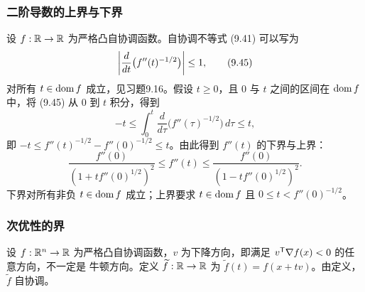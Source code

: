 \subsubsection*{二阶导数的上界与下界}
设 $f:\mathbb R\to\mathbb R$ 为严格凸自协调函数。自协调不等式 (9.41) 可以写为
\begin{equation}
 \left\lvert \frac d{dt}\bigl(f''(t)^{-1/2}\bigr)\right\rvert\le1,\tag{9.45}
\end{equation}
对所有 $t\in\operatorname{dom} f$ 成立，见习题9.16。假设 $t\ge0$，且 $0$ 与 $t$ 之间的区间在 $\operatorname{dom} f$ 中，将 (9.45) 从 $0$ 到 $t$ 积分，得到
\[
 -t\le\int_0^t\frac d{d\tau}\bigl(f''(\tau)^{-1/2}\bigr)\,d\tau\le t,
\]
即 $-t\le f''(t)^{-1/2}-f''(0)^{-1/2}\le t$。由此得到 $f''(t)$ 的下界与上界：
\begin{equation}
 \frac{f''(0)}{(1+tf''(0)^{1/2})^2}\le f''(t)
 \le\frac{f''(0)}{(1-tf''(0)^{1/2})^2}.\tag{9.46}
\end{equation}
下界对所有非负 $t\in\operatorname{dom} f$ 成立；上界要求 $t\in\operatorname{dom} f$ 且 $0\le t<f''(0)^{-1/2}$。

\subsubsection*{次优性的界}
设 $f:\mathbb R^n\to\mathbb R$ 为严格凸自协调函数，$v$ 为下降方向，即满足 $v^\mathsf T\nabla f(x)<0$ 的任意方向，不一定是
牛顿方向。定义 $\widetilde f:\mathbb R\to\mathbb R$ 为 $\widetilde f(t)=f(x+tv)$。由定义，$\widetilde f$ 自协调。

